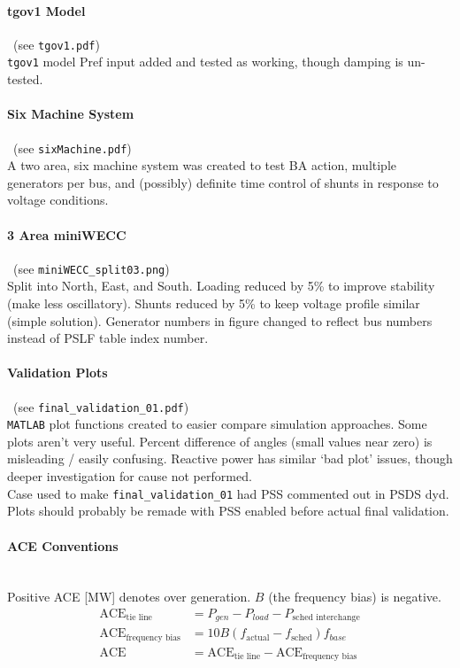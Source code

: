 \documentclass[12pt]{article}
\begin{document}
\paragraph{tgov1 Model} \ (see \verb|tgov1.pdf|)\\
\verb|tgov1| model Pref input added and tested as working, though damping is un-tested.

\paragraph{Six Machine System} \ (see \verb|sixMachine.pdf|)\\
A two area, six machine system was created to test BA action, multiple generators per bus, and (possibly) definite time control of shunts in response to voltage conditions.

\paragraph{3 Area  miniWECC} \ (see \verb|miniWECC_split03.png|)\\
Split into North, East, and South. Loading reduced by 5\% to improve stability (make less oscillatory). Shunts reduced by 5\% to keep voltage profile similar (simple solution). Generator numbers in figure changed to reflect bus numbers instead of PSLF table index number.

\paragraph{Validation Plots} \ (see \verb|final_validation_01.pdf|)\\
\verb|MATLAB| plot functions created to easier compare simulation approaches. Some plots aren't very useful. Percent difference of angles (small values near zero) is misleading / easily confusing. Reactive power has similar `bad plot' issues, though deeper investigation for cause not performed.\\

Case used to make \verb|final_validation_01| had PSS commented out in PSDS dyd. Plots should probably be remade with PSS enabled before actual final validation. %

\paragraph{ACE Conventions} \ \\
Positive ACE [MW] denotes over generation. $B$ (the frequency bias) is negative.
\begin{align*}
\text{ACE}_{\text{tie line}} &= P_{gen} - P_{load} - P_{\text{sched interchange}}\\
\text{ACE}_{\text{frequency bias}} &= 10B(f_{\text{actual}}-f_{\text{sched}})f_{base}\\
\text{ACE} &= \text{ACE}_{\text{tie line}} -\text{ACE}_{\text{frequency bias}}
\end{align*}
\end{document}
